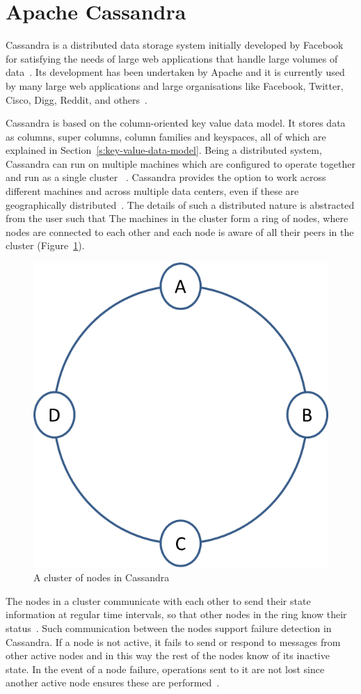 \section{Apache Cassandra} \label{s:Background-Cassandra}

Cassandra is a distributed data storage system initially developed by Facebook
for satisfying the needs of large web applications that handle large
volumes of data~\citep{BOOK}. 
Its development has been undertaken by Apache  and it is  currently used by
many large web applications and large organisations like Facebook,  Twitter, 
Cisco,  Digg,  Reddit, and others~\citep{datastaxB}. 

Cassandra is based on the column-oriented key value data model. It stores data
as columns,  super columns,  column families and keyspaces, all of which are
explained in Section~\ref{s:key-value-data-model}. Being a distributed
system, Cassandra can run on multiple machines which are
configured to operate together and run as a single
cluster~\citep{datastax,BOOK} .
Cassandra provides the option  to work across different machines and across
multiple data centers,  even if these  are geographically
distributed~\citep{BOOK}.
The details of such a distributed nature is abstracted from  the user such that 
The machines in the cluster form a ring of nodes,  where
nodes are connected to each other and each node is aware of all their peers in
the cluster (Figure~\ref{f:cassandra-cluster}).


\begin{figure}[h] \centering 
\includegraphics[width=.3\textwidth]{./figure/Background/CassandraCluster.png}
	\caption{A cluster of nodes in Cassandra}\label{f:cassandra-cluster}
\end{figure}

The nodes in a cluster communicate with each other to send their state
information at regular time intervals,  so that other nodes in the ring  know
their status~\citep{BOOK,cassandra}. Such communication
between the nodes support failure detection in Cassandra.
If a node is not active,  it fails to send or respond to messages from other
active nodes and in this way the rest of the nodes  know of its inactive state.
In the event of a node failure,
operations sent to it are not lost since another active node ensures these are
performed~\citep{cassandra}.

